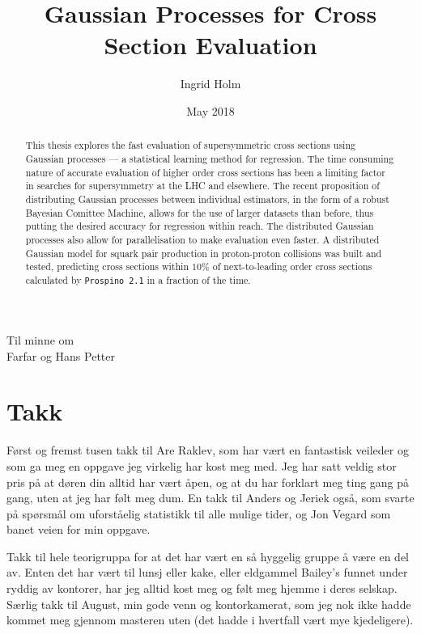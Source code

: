 \documentclass[twoside,english]{uiofysmaster}
\begin{document}
\title{Gaussian Processes for Cross Section Evaluation}
\author{Ingrid Holm}
\date{May 2018}

\maketitle

\begin{abstract}
This thesis explores the fast evaluation of supersymmetric cross sections using Gaussian processes --- a statistical learning method for regression.  
The time consuming nature of accurate evaluation of higher order cross sections has been a limiting factor in searches for supersymmetry at the LHC and elsewhere.
The recent proposition of distributing Gaussian processes between individual estimators, in the form of a robust Bayesian Comittee Machine, allows for the use of larger datasets than before, thus putting the desired accuracy for regression within reach. The distributed Gaussian processes also allow for parallelisation to make evaluation even  faster. A distributed Gaussian model for squark pair production in proton-proton collisions was built and tested, predicting cross sections within $10 \%$ of next-to-leading order cross sections calculated by \verb|Prospino 2.1| in a fraction of the time.
\end{abstract}

\begin{dedication}
  Til minne om
  \\\vspace{12pt}
  Farfar og Hans Petter
\end{dedication}


\chapter*{\centering Takk}
F{\o}rst og fremst tusen takk til Are Raklev, som har v{\ae}rt en fantastisk veileder og som ga meg en oppgave jeg virkelig har kost meg med. Jeg har satt veldig stor pris p{\aa} at d{\o}ren din alltid har vært {\aa}pen, og at du har forklart meg ting gang på gang, uten at jeg har følt meg dum. En takk til Anders og Jeriek ogs{\aa}, som svarte p{\aa} sp{\o}rsm{\aa}l om uforst{\aa}elig statistikk til alle mulige tider, og Jon Vegard som banet veien for min oppgave. 

Takk til hele teorigruppa for at det har v{\ae}rt en s{\aa} hyggelig gruppe {\aa} v{\ae}re en del av. Enten det har v{\ae}rt til lunsj eller kake, eller eldgammel Bailey's funnet under ryddig av kontorer, har jeg alltid kost meg og følt meg hjemme i deres selskap. S{\ae}rlig takk til August, min gode venn og kontorkamerat, som jeg nok ikke hadde kommet meg gjennom masteren uten (det hadde i hvertfall v{\ae}rt mye kjedeligere).
\end{document}
